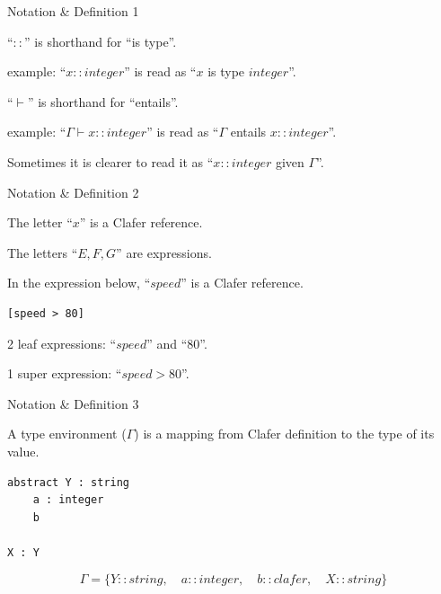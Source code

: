 \documentclass[table,15pt,t]{beamer}
\begin{document}
\begin{frame}[fragile,c]{Notation \& Definition 1}
\begin{definition}
``$::$'' is shorthand for ``is type''.
\end{definition}
example: ``$x::integer$'' is read as ``$x$ is type $integer$''.

\begin{definition}
``$\vdash$'' is shorthand for ``entails''.
\end{definition}

example: ``$\Gamma\vdash x::integer$'' is read as ``$\Gamma$ entails $x::integer$''.

Sometimes it is clearer to read it as ``$x::integer$ given $\Gamma$''.
\end{frame}


\begin{frame}[fragile,c]{Notation \& Definition 2}
\begin{definition}
The letter ``$x$'' is a Clafer reference.
\end{definition}

\begin{definition}
The letters ``$E,F,G$'' are expressions.
\end{definition}

In the expression below, ``$speed$'' is a Clafer reference.
\begin{lstlisting}
[speed > 80]
\end{lstlisting}

2 leaf expressions: ``$speed$'' and ``$80$''.

1 super expression: ``$speed > 80$''.
\end{frame}

\begin{frame}[fragile,c]{Notation \& Definition 3}

\begin{definition}
A type environment ($\Gamma$) is a mapping from Clafer definition to the type of its value.
\end{definition}

\vfill \begin{lstlisting}
abstract Y : string
    a : integer
    b

X : Y
\end{lstlisting}

\begin{equation*}
\Gamma = \{ Y::string,\quad a::integer,\quad b::clafer,\quad X::string \}
\end{equation*}
\end{frame}
\end{document}
